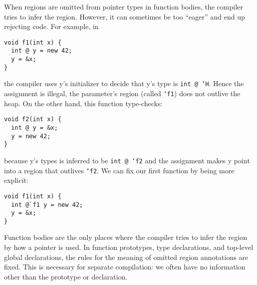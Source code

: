
When regions are omitted from pointer types in function bodies, the
compiler tries to infer the region.  However, it can sometimes be too
``eager'' and end up rejecting code.  For example, in
\begin{verbatim}
void f1(int x) {
  int @ y = new 42;
  y = &x;
}
\end{verbatim}
the compiler uses y's initializer to decide that y's type is
\texttt{int @ `H}.  Hence the assignment is illegal, the parameter's
region (called \texttt{`f1}) does not outlive the heap.  On the other
hand, this function type-checks:
\begin{verbatim}
void f2(int x) {
  int @ y = &x;
  y = new 42;
}
\end{verbatim}
because y's types is inferred to be \texttt{int @ `f2} and the
assignment makes y point into a region that outlives \texttt{`f2}.  We
can fix our first function by being more explicit:
\begin{verbatim}
void f1(int x) {
  int @`f1 y = new 42;
  y = &x;
}
\end{verbatim}

Function bodies are the only places where the compiler tries to infer
the region by how a pointer is used.  In function prototypes, type
declarations, and top-level global declarations, the rules for the
meaning of omitted region annotations are fixed.  This is necessary
for separate compilation: we often have no information other than the
prototype or declaration.

